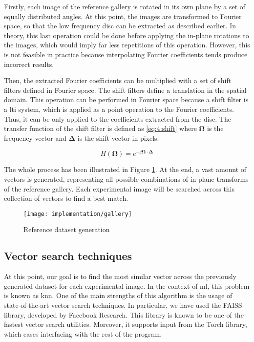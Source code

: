 \documentclass[../main.tex]{subfiles}
\begin{document}
Firstly, each image of the reference gallery is rotated in its own plane by a set of equally distributed angles. At this point, the images are transformed to Fourier space, so that the low frequency disc can be extracted as described earlier. In theory, this last operation could be done before applying the in-plane rotations to the images, which would imply far less repetitions of this operation. However, this is not feasible in practice because interpolating Fourier coefficients tends produce incorrect results.

Then, the extracted Fourier coefficients can be multiplied with a set of shift filters defined in Fourier space. The shift filters define a translation in the spatial domain. This operation can be performed in Fourier space because a shift filter is a \gls{lti} system, which is applied as a point operation to the Fourier coefficients. Thus, it can be only applied to the coefficients extracted from the disc. The transfer function of the shift filter is defined as \eqref{eq:4:shift} where $\bm{\Omega}$ is the frequency vector and $\bm{\Delta}$ is the shift vector in pixels.

\begin{equation}\label{eq:4:shift}
    H(\bm{\Omega}) = e^{-j\bm{\Omega} \cdot \bm{\Delta}}
\end{equation}

The whole process has been illustrated in Figure \ref{fig:4:reference}. At the end, a vast amount of vectors is generated, representing all possible combinations of in-plane transforms of the reference gallery. Each experimental image will be searched across this collection of vectors to find a best match.

\begin{figure}[htbp]
    \centering
    \texttt{[image: implementation/gallery]}
    \caption{Reference dataset generation}
    \label{fig:4:reference}
\end{figure}

\subsection{Vector search techniques}
At this point, our goal is to find the most similar vector across the previously generated dataset for each experimental image. In the context of \gls{ml}, this problem is known as \gls{knn}. One of the main strengths of this algorithm is the usage of state-of-the-art vector search techniques. In particular, we have used the FAISS library\cite{johnson2019}, developed by Facebook Research. This library is known to be one of the fastest vector search utilities. Moreover, it supports input from the Torch library, which eases interfacing with the rest of the program.
\end{document}
